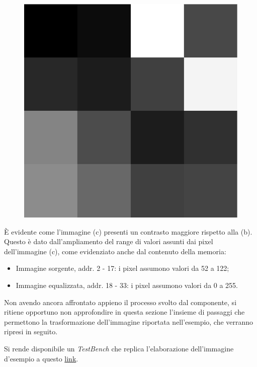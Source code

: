 \documentclass{article}
\begin{document}
\begin{figure}[ht]
\begin{minipage}[c]{.3\linewidth}
        \includegraphics[scale=0.25]{immElab.jpg}
        \label{esempio3}
    \end{minipage}
\end{figure}
\vspace{0.3cm}

È evidente come l'immagine \small (c) \normalsize presenti un contrasto maggiore rispetto alla \small(b)\normalsize.
Questo è dato dall'ampliamento del range di valori assunti dai pixel dell'immagine \small (c)\normalsize, come evidenziato anche dal contenuto della memoria:
\begin{itemize}
    \item Immagine sorgente, addr. 2 - 17: i pixel assumono valori da 52 a 122;
    \item Immagine equalizzata, addr. 18 - 33: i pixel assumono valori da 0 a 255.
\end{itemize}

Non avendo ancora affrontato appieno il processo svolto dal componente, si ritiene opportuno non approfondire in questa sezione
l'insieme di passaggi che permettono la trasformazione dell'immagine riportata nell'esempio, che verranno ripresi in seguito. \par
Si rende disponibile un \emph{TestBench} che replica l'elaborazione dell'immagine d'esempio a questo \href{https://polimi365-my.sharepoint.com/:f:/g/personal/10628782_polimi_it/EgwOb4V2Oj5Cnx3qEVuZ200BZdZsEs7zgI2Tc3eQFnCPpg?e=h7xHbB}{link}.
\vspace{1cm}
\end{document}
